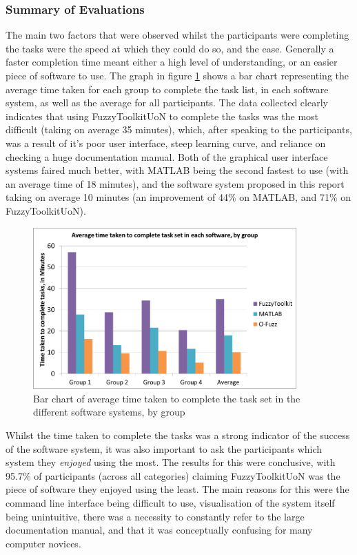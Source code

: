 \subsubsection{Summary of Evaluations}	
The main two factors that were observed whilst the participants were completing the tasks were the speed at which they could do so, and the ease. Generally a faster completion time meant either a high level of understanding, or an easier piece of software to use. The graph in figure \ref{fig:times} shows a bar chart representing the average time taken for each group to complete the task list, in each software system, as well as the average for all participants. The data collected clearly indicates that using FuzzyToolkitUoN to complete the tasks was the most difficult (taking on average  35 minutes), which, after speaking to the participants, was a result of it's poor user interface, steep learning curve, and reliance on checking a huge documentation manual. Both of the graphical user interface systems faired much better, with MATLAB being the second fastest to use (with an average time of 18 minutes), and the software system proposed in this report taking on average 10 minutes (an improvement of 44\% on MATLAB, and 71\% on FuzzyToolkitUoN). 
			
\begin{figure}[ht!]
	\begin{center}
		\includegraphics[width=0.9\textwidth]{images/timeTaken}
	\end{center}
	\vspace{-5mm}
	\captionsetup{justification=centering,margin=2cm}
	\caption{Bar chart of average time taken to complete the task set in the different software systems, by group}
	\label{fig:times}
	\vspace{-2mm}
\end{figure}
\noindent 						
Whilst the time taken to complete the tasks was a strong indicator of the success of the software system, it was also important to ask the participants which system they \emph{enjoyed} using the most. The results for this were conclusive, with 95.7\% of participants (across all categories) claiming FuzzyToolkitUoN was the piece of software they enjoyed using the least. The main reasons for this were the command line interface being difficult to use, visualisation of the system itself being unintuitive, there was a necessity to constantly refer to the large documentation manual, and that it was conceptually confusing for many computer novices. 

